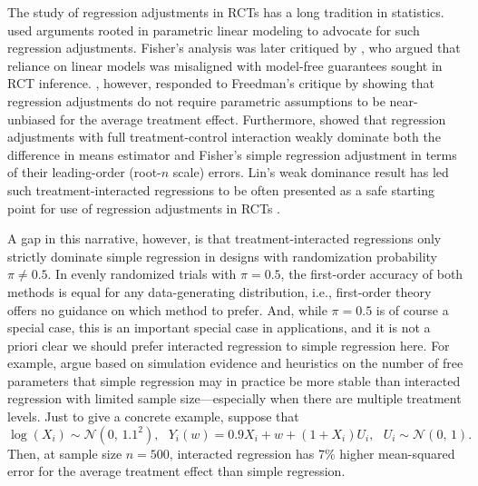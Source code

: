 \documentclass{article}
\newcommand{\nn}{\mathcal{N}}
\newcommand{\p}[1]{\left(#1\right)}
\theoremstyle{plain}
\theoremstyle{definition}
\theoremstyle{remark}
\begin{document}
The study of regression adjustments in RCTs has a long tradition in statistics. \citet{fisher1935design} used arguments rooted in parametric linear modeling to advocate for such regression adjustments. Fisher's analysis was later critiqued by \citet{Freedman2008}, who argued that reliance on linear models was misaligned with model-free guarantees sought in RCT inference. \citet{Lin2013}, however, responded to Freedman's critique by showing that regression adjustments do not require parametric assumptions to be near-unbiased for the average treatment effect. Furthermore, \citet{Lin2013} showed that regression adjustments with full treatment-control interaction weakly dominate both the difference in means estimator and Fisher's simple regression adjustment in terms of their leading-order (root-$n$ scale) errors. Lin's weak dominance result has led such treatment-interacted regressions to be often presented as a safe starting point for use of regression adjustments in RCTs \citep{li2017general,negi2021revisiting,Wager2025}.

A gap in this narrative, however, is that treatment-interacted regressions only strictly dominate simple regression in designs with randomization probability $\pi \neq 0.5$. In evenly randomized trials with $\pi = 0.5$, the first-order accuracy of both methods is equal for any data-generating distribution, i.e., first-order theory offers no guidance on which method to prefer. And, while $\pi = 0.5$ is of course a special case, this is an important special case in applications, and it is not a priori clear we should prefer interacted regression to simple regression here. For example, \citet{zhao2023covariate} argue based on simulation evidence and heuristics on the number of free parameters that simple regression may in practice be more stable than interacted regression with limited sample size---especially when there are multiple treatment levels.
Just to give a concrete example, suppose that
\begin{equation}
\label{eq:warmup}
\log(X_i) \sim \nn\p{0, \, 1.1^2}, \ \ \ Y_i(w) = 0.9 X_i + w + (1 + X_i) U_i, \ \ \ U_i \sim \nn\p{0, \, 1}.
\end{equation}
Then, at sample size $n = 500$, interacted regression has 7\% higher mean-squared error for the average treatment effect than simple regression.
\end{document}
